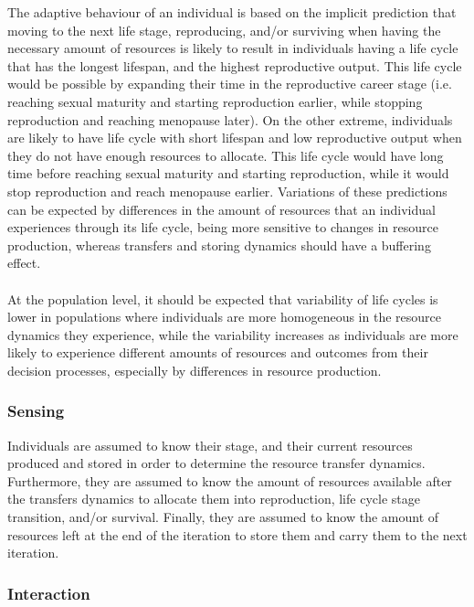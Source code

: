 \documentclass{article}
\begin{document}
The adaptive behaviour of an individual is based on the implicit prediction that moving to the next life stage, reproducing, and/or surviving when having the necessary amount of resources is likely to result in individuals having a life cycle that has the longest lifespan, and the highest reproductive output. This life cycle would be possible by expanding their time in the reproductive career stage (i.e. reaching sexual maturity and starting reproduction earlier, while stopping reproduction and reaching menopause later). On the other extreme, individuals are likely to have life cycle with short lifespan and low reproductive output when they do not have enough resources to allocate. This life cycle would have long time before reaching sexual maturity and starting reproduction, while it would stop reproduction and reach menopause earlier. Variations of these predictions can be expected by differences in the amount of resources that an individual experiences through its life cycle, being more sensitive to changes in resource production, whereas transfers and storing dynamics should have a buffering effect.
\\\\
At the population level, it should be expected that variability of life cycles is lower in populations where individuals are more homogeneous in the resource dynamics they experience, while the variability increases as individuals are more likely to experience different amounts of resources and outcomes from their decision processes, especially by differences in resource production.

\subsubsection{Sensing}

Individuals are assumed to know their stage, and their current resources produced and stored in order to determine the resource transfer dynamics. Furthermore, they are assumed to know the amount of resources available after the transfers dynamics to allocate them into reproduction, life cycle stage transition, and/or survival. Finally, they are assumed to know the amount of resources left at the end of the iteration to store them and carry them to the next iteration.


\subsubsection{Interaction}
\end{document}

